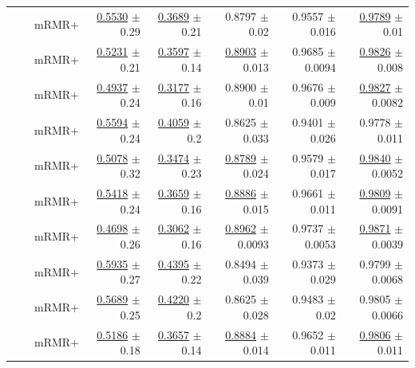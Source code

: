 \begin{longtable}{llp{}rrrrr}
 &  & mRMR+ & \underline{0.5530} {\scriptsize $\pm$ 0.29} & \underline{0.3689} {\scriptsize $\pm$ 0.21} & 0.8797 {\scriptsize $\pm$ 0.02} & 0.9557 {\scriptsize $\pm$ 0.016} & \underline{0.9789} {\scriptsize $\pm$ 0.01} \\
 &  & mRMR+ & \underline{0.5231} {\scriptsize $\pm$ 0.21} & \underline{0.3597} {\scriptsize $\pm$ 0.14} & \underline{0.8903} {\scriptsize $\pm$ 0.013} & 0.9685 {\scriptsize $\pm$ 0.0094} & \underline{0.9826} {\scriptsize $\pm$ 0.008} \\
 &  & mRMR+ & \underline{0.4937} {\scriptsize $\pm$ 0.24} & \underline{0.3177} {\scriptsize $\pm$ 0.16} & 0.8900 {\scriptsize $\pm$ 0.01} & 0.9676 {\scriptsize $\pm$ 0.009} & \underline{0.9827} {\scriptsize $\pm$ 0.0082} \\
 &  & mRMR+ & \underline{0.5594} {\scriptsize $\pm$ 0.24} & \underline{0.4059} {\scriptsize $\pm$ 0.2} & 0.8625 {\scriptsize $\pm$ 0.033} & 0.9401 {\scriptsize $\pm$ 0.026} & 0.9778 {\scriptsize $\pm$ 0.011} \\
 &  & mRMR+ & \underline{0.5078} {\scriptsize $\pm$ 0.32} & \underline{0.3474} {\scriptsize $\pm$ 0.23} & \underline{0.8789} {\scriptsize $\pm$ 0.024} & 0.9579 {\scriptsize $\pm$ 0.017} & \underline{0.9840} {\scriptsize $\pm$ 0.0052} \\
 &  & mRMR+ & \underline{0.5418} {\scriptsize $\pm$ 0.24} & \underline{0.3659} {\scriptsize $\pm$ 0.16} & \underline{0.8886} {\scriptsize $\pm$ 0.015} & 0.9661 {\scriptsize $\pm$ 0.011} & \underline{0.9809} {\scriptsize $\pm$ 0.0091} \\
 &  & mRMR+ & \underline{0.4698} {\scriptsize $\pm$ 0.26} & \underline{0.3062} {\scriptsize $\pm$ 0.16} & \underline{0.8962} {\scriptsize $\pm$ 0.0093} & 0.9737 {\scriptsize $\pm$ 0.0053} & \underline{0.9871} {\scriptsize $\pm$ 0.0039} \\
 &  & mRMR+ & \underline{0.5935} {\scriptsize $\pm$ 0.27} & \underline{0.4395} {\scriptsize $\pm$ 0.22} & 0.8494 {\scriptsize $\pm$ 0.039} & 0.9373 {\scriptsize $\pm$ 0.029} & 0.9799 {\scriptsize $\pm$ 0.0068} \\
 &  & mRMR+ & \underline{0.5689} {\scriptsize $\pm$ 0.25} & \underline{0.4220} {\scriptsize $\pm$ 0.2} & 0.8625 {\scriptsize $\pm$ 0.028} & 0.9483 {\scriptsize $\pm$ 0.02} & 0.9805 {\scriptsize $\pm$ 0.0066} \\
 &  & mRMR+ & \underline{0.5186} {\scriptsize $\pm$ 0.18} & \underline{0.3657} {\scriptsize $\pm$ 0.14} & \underline{0.8884} {\scriptsize $\pm$ 0.014} & 0.9652 {\scriptsize $\pm$ 0.011} & \underline{0.9806} {\scriptsize $\pm$ 0.011} \\

\end{longtable}
